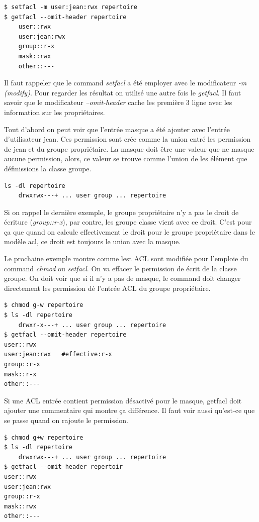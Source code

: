 \begin{verbatim}
$ setfacl -m user:jean:rwx repertoire
$ getfacl --omit-header repertoire 
	user::rwx 
	user:jean:rwx	
	group::r-x 
	mask::rwx 
	other::---
\end{verbatim}

Il faut rappeler que le command \emph{setfacl} a été employer avec le modificateur \emph{-m (modify)}. Pour regarder les résultat on utilisé une autre fois le \emph{getfacl}. Il faut savoir que le modificateur \emph{--omit-header} cache les première 3 ligne avec les information sur les propriétaires.  

Tout d'abord on peut voir que l'entrée masque a été ajouter avec l'entrée d'utilisateur jean. Ces permission sont crée comme la union entré les permission de jean et du groupe propriétaire. La masque doit être une valeur que ne masque aucune permission, alors, ce valeur se trouve comme l'union de les élément que définissions la classe groupe.  

\begin{verbatim}
ls -dl repertoire
	drwxrwx---+ ... user group ... repertoire
\end{verbatim}

Si on rappel le dernière exemple, le groupe propriétaire n'y a pas le droit de écriture (\emph{group::r-x}), par contre, les groupe classe vient avec ce droit. C'est pour ça que quand on calcule effectivement le droit pour le groupe propriétaire dans le modèle acl, ce droit est toujours le union avec la masque.

Le prochaine exemple montre comme lest ACL sont modifiée pour l'emploie du command \emph{chmod} ou \emph{setfacl}. On va effacer le permission de écrit de la classe groupe. On doit voir que si il n'y a pas de masque, le command doit changer directement les permission dé l'entrée ACL du groupe propriétaire. 


\begin{verbatim}
$ chmod g-w repertoire 
$ ls -dl repertoire 
	drwxr-x---+ ... user group ... repertoire 
$ getfacl --omit-header repertoire 
user::rwx 
user:jean:rwx 	#effective:r-x
group::r-x 	
mask::r-x 
other::---

\end{verbatim}

Si une ACL entrée contient permission désactivé pour le masque, getfacl doit ajouter une commentaire qui montre ça différence. Il faut voir aussi qu'est-ce que se passe quand on rajoute le permission. 

\begin{verbatim}
$ chmod g+w repertoire 
$ ls -dl repertoire 
	drwxrwx---+ ... user group ... repertoire 
$ getfacl --omit-header repertoir 
user::rwx 
user:jean:rwx 
group::r-x
mask::rwx
other::---
\end{verbatim}

